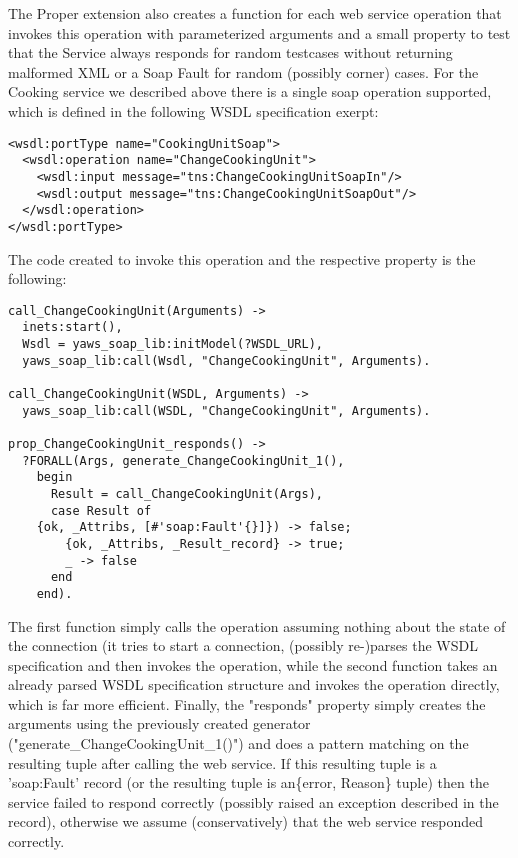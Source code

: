 \documentclass[11pt]{article} %
\begin{document}
The Proper extension also creates a function for each web service operation that invokes this operation with parameterized arguments and a small property to test that the Service always responds for random testcases without returning malformed XML or a Soap Fault for random (possibly corner) cases. For the Cooking service we described above there is a single soap operation supported, which is defined in the following WSDL specification exerpt:

\begin{lstlisting}
<wsdl:portType name="CookingUnitSoap">
  <wsdl:operation name="ChangeCookingUnit">
    <wsdl:input message="tns:ChangeCookingUnitSoapIn"/>
    <wsdl:output message="tns:ChangeCookingUnitSoapOut"/>
  </wsdl:operation>
</wsdl:portType>
\end{lstlisting}

The code created to invoke this operation and the respective property is the following:

\begin{lstlisting}
call_ChangeCookingUnit(Arguments) ->
  inets:start(),
  Wsdl = yaws_soap_lib:initModel(?WSDL_URL),
  yaws_soap_lib:call(Wsdl, "ChangeCookingUnit", Arguments).

call_ChangeCookingUnit(WSDL, Arguments) ->
  yaws_soap_lib:call(WSDL, "ChangeCookingUnit", Arguments).

prop_ChangeCookingUnit_responds() ->
  ?FORALL(Args, generate_ChangeCookingUnit_1(),
    begin
      Result = call_ChangeCookingUnit(Args),
      case Result of
	{ok, _Attribs, [#'soap:Fault'{}]}) -> false;
        {ok, _Attribs, _Result_record} -> true;
        _ -> false
      end
    end).
\end{lstlisting}

The first function simply calls the operation assuming nothing about the state of the connection (it tries to start a connection, (possibly re-)parses the WSDL specification and then invokes the operation, while the second function takes an already parsed WSDL specification structure and invokes the operation directly, which is far more efficient. Finally, the "responds" property simply creates the arguments using the previously created generator ("generate\_ChangeCookingUnit\_1()") and does a pattern matching on the resulting tuple after calling the web service. If this resulting tuple is a 'soap:Fault' record (or the resulting tuple is an\{error, Reason\} tuple) then the service failed to respond correctly (possibly raised an exception described in the record), otherwise we assume (conservatively) that the web service responded correctly.
\end{document}
